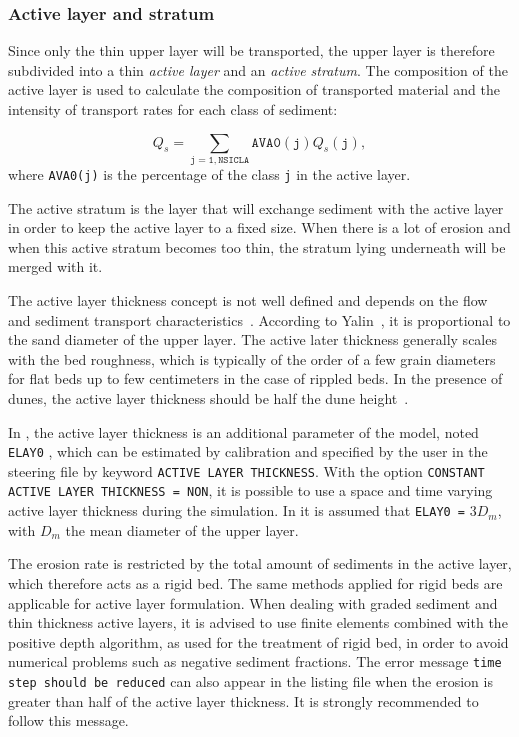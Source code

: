 \subsubsection{Active layer and stratum}
Since only the thin upper layer will be transported, the upper layer is
therefore subdivided into a thin \emph{active layer} and an \emph{active
stratum}. The composition of the active layer is used to calculate the composition of
transported material and the intensity of transport rates for each class of
sediment:

\begin{equation}\label{eq:qsclass}
Q_s =\sum_{\mathtt{j=1,NSICLA}} \mathtt{AVA0(j)} Q_s\mathtt{(j)}, 
\end{equation}
where \texttt{AVA0(j)} is the percentage of the class \texttt{j} in the active layer.

The active stratum is the layer that will exchange sediment with the active
layer in order to keep the active layer to a fixed size. When there is a lot
of erosion and when this active stratum becomes too thin, the stratum lying
underneath will be merged with it.

The active layer thickness concept is not well defined and depends on the flow and
sediment transport characteristics~\cite{vanRijn87}. According to Yalin~\cite{Yalin}, 
it is proportional to the sand diameter of the upper layer. 
The active later thickness generally scales with the bed roughness,
which is typically of the order of a few grain diameters for flat beds up to
few centimeters in the case of rippled beds. In the presence of dunes, the active
layer thickness should be half the dune height~\cite{Ribberink}. 

In \sisyphe, the active layer thickness is an additional parameter of the model, noted \texttt{ELAY0}
, which can be estimated by calibration and specified by the
user in the steering file by keyword \texttt{ACTIVE LAYER THICKNESS}. With the
option \texttt{CONSTANT ACTIVE LAYER THICKNESS = NON}, it is possible to use a space and time varying active layer thickness during the simulation. In \sisyphe it is assumed that \texttt{ELAY0 =} $3 D_m$, with $D_m$ the mean diameter of the
upper layer.

The erosion rate is restricted by the total amount of sediments in the
active layer, which therefore acts as a rigid bed. The same methods applied
for rigid beds are applicable for active layer formulation. When dealing
with graded sediment and thin thickness active layers, it is advised to use finite elements combined with the positive depth algorithm, as used for the treatment of rigid bed, in order to avoid numerical problems such as negative sediment fractions. The error message \texttt{time step should be reduced} can also appear in the listing
file when the erosion is greater than half of the active layer thickness. It
is strongly recommended to follow this message.

